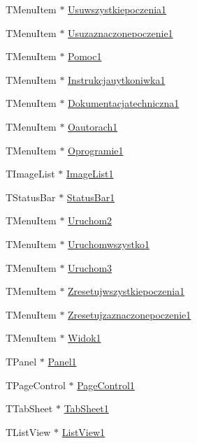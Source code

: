 \begin{CompactItemize}
\item 
TMenuItem $\ast$ \hyperlink{classTForm1_725cf7f5e578ee304efeeb97522e4812}{Usuwszystkiepoczenia1}
\item 
TMenuItem $\ast$ \hyperlink{classTForm1_3a1a0d7e4b61af79e2119fc8e171b267}{Usuzaznaczonepoczenie1}
\item 
TMenuItem $\ast$ \hyperlink{classTForm1_1be67d689b1e4751c5043657cde7fb7e}{Pomoc1}
\item 
TMenuItem $\ast$ \hyperlink{classTForm1_015daea982a9bfc8c84724ed5db93435}{Instrukcjauytkoniwka1}
\item 
TMenuItem $\ast$ \hyperlink{classTForm1_edc7039427508f681377845a13eb7c5b}{Dokumentacjatechniczna1}
\item 
TMenuItem $\ast$ \hyperlink{classTForm1_bfdab287b3fce9e306b007b0530e90ac}{Oautorach1}
\item 
TMenuItem $\ast$ \hyperlink{classTForm1_9ed5ecf8b1efefab3f773cfbd4c163d9}{Oprogramie1}
\item 
TImageList $\ast$ \hyperlink{classTForm1_6eb05a9c9d980ca92fa5a9dd976116df}{ImageList1}
\item 
TStatusBar $\ast$ \hyperlink{classTForm1_ad39517b2c266c91d742acba97cec969}{StatusBar1}
\item 
TMenuItem $\ast$ \hyperlink{classTForm1_cc303ecddd253f90d5b943f96828b5ff}{Uruchom2}
\item 
TMenuItem $\ast$ \hyperlink{classTForm1_ab12b0763ade8d2303fc0d9e9dba2757}{Uruchomwszystko1}
\item 
TMenuItem $\ast$ \hyperlink{classTForm1_6f669f8e377edc9a83fc863c880a2940}{Uruchom3}
\item 
TMenuItem $\ast$ \hyperlink{classTForm1_82b4fa841135fca89c74efd1a699ba6d}{Zresetujwszystkiepoczenia1}
\item 
TMenuItem $\ast$ \hyperlink{classTForm1_a87f55c562f7b38bcf5e4388a94cf09c}{Zresetujzaznaczonepoczenie1}
\item 
TMenuItem $\ast$ \hyperlink{classTForm1_d022e2ac667384e64e28f323134fe641}{Widok1}
\item 
TPanel $\ast$ \hyperlink{classTForm1_42146ef4803abfd8ffd5d546f2465d6d}{Panel1}
\item 
TPageControl $\ast$ \hyperlink{classTForm1_0fc87f66d019c1324bc038c5beb168c0}{PageControl1}
\item 
TTabSheet $\ast$ \hyperlink{classTForm1_6d1c57fe4450ad878c2a4d8f65ffc72a}{TabSheet1}
\item 
TListView $\ast$ \hyperlink{classTForm1_10ab751cdcb401695d16b29bec7667da}{ListView1}

\end{CompactItemize}
